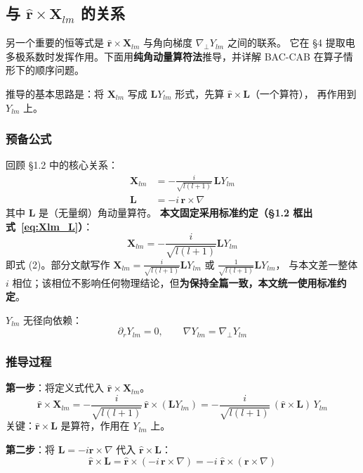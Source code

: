 \subsection{与 $\hat{\mathbf{r}}\times\mathbf{X}_{lm}$ 的关系}

另一个重要的恒等式是 $\hat{\mathbf{r}}\times\mathbf{X}_{lm}$ 与角向梯度 $\nabla_\perp Y_{lm}$ 之间的联系。
它在 \S4 提取电多极系数时发挥作用。下面用\textbf{纯角动量算符法}推导，并详解 BAC-CAB 在算子情形下的顺序问题。

推导的基本思路是：将 $\mathbf{X}_{lm}$ 写成 $\mathbf{L}Y_{lm}$ 形式，先算 $\hat{\mathbf{r}}\times\mathbf{L}$（一个算符），
再作用到 $Y_{lm}$ 上。

\subsubsection{预备公式}

回顾 §1.2 中的核心关系：
\begin{align}
  \mathbf{X}_{lm} &= -\frac{i}{\sqrt{l(l+1)}}\,\mathbf{L}Y_{lm} \tag{2}\\
  \mathbf{L} &= -i\,\mathbf{r}\times\nabla \tag{1}
\end{align}
其中 $\mathbf{L}$ 是（无量纲）角动量算符。
\textbf{本文固定采用标准约定（\S1.2 框出式~\ref{eq:Xlm_L}）}：
$$
\mathbf{X}_{lm} = -\frac{i}{\sqrt{l(l+1)}}\mathbf{L}Y_{lm}
$$
即式 (2)。部分文献写作 $\mathbf{X}_{lm} = \frac{i}{\sqrt{l(l+1)}}\mathbf{L}Y_{lm}$ 或 $\frac{1}{\sqrt{l(l+1)}}\mathbf{L}Y_{lm}$，
与本文差一整体 $i$ 相位；该相位不影响任何物理结论，但\textbf{为保持全篇一致，本文统一使用标准约定}。

$Y_{lm}$ 无径向依赖：
$$
\partial_r Y_{lm} = 0,\qquad \nabla Y_{lm} = \nabla_\perp Y_{lm}
$$

\subsubsection{推导过程}

\textbf{第一步}：将定义式代入 $\hat{\mathbf{r}}\times\mathbf{X}_{lm}$。
$$
\hat{\mathbf{r}}\times\mathbf{X}_{lm}
= -\frac{i}{\sqrt{l(l+1)}}\,\hat{\mathbf{r}}\times(\mathbf{L}Y_{lm})
= -\frac{i}{\sqrt{l(l+1)}}\,(\hat{\mathbf{r}}\times\mathbf{L})\,Y_{lm}
$$
关键：$\hat{\mathbf{r}}\times\mathbf{L}$ 是算符，作用在 $Y_{lm}$ 上。

\textbf{第二步}：将 $\mathbf{L} = -i\mathbf{r}\times\nabla$ 代入 $\hat{\mathbf{r}}\times\mathbf{L}$：
$$
\hat{\mathbf{r}}\times\mathbf{L} = \hat{\mathbf{r}}\times(-i\,\mathbf{r}\times\nabla)
= -i\;\hat{\mathbf{r}}\times(\mathbf{r}\times\nabla)
$$

